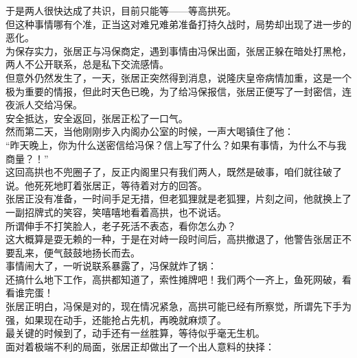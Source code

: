 \begin{multicols}{\theparacolNo}
于是两人很快达成了共识，目前只能等——等高拱死。\\

但这种事情哪有个准，正当这对难兄难弟准备打持久战时，局势却出现了进一步的恶化。\\

为保存实力，张居正与冯保商定，遇到事情由冯保出面，张居正躲在暗处打黑枪，两人不公开联系，总是私下交流感情。\\

但意外仍然发生了，一天，张居正突然得到消息，说隆庆皇帝病情加重，这是一个极为重要的情报，但此时天色已晚，为了给冯保报信，张居正便写了一封密信，连夜派人交给冯保。\\

安全抵达，安全返回，张居正松了一口气。\\

然而第二天，当他刚刚步入内阁办公室的时候，一声大喝镇住了他：\\

“昨天晚上，你为什么送密信给冯保？信上写了什么？如果有事情，为什么不与我商量？！”\\

这回高拱也不兜圈子了，反正内阁里只有我们两人，既然是破事，咱们就往破了说。他死死地盯着张居正，等待着对方的回答。\\

张居正没有准备，一时间手足无措，但老狐狸就是老狐狸，片刻之间，他就换上了一副招牌式的笑容，笑嘻嘻地看着高拱，也不说话。\\

所谓伸手不打笑脸人，老子死活不表态，看你怎么办？\\

这大概算是耍无赖的一种，于是在对峙一段时间后，高拱撤退了，他警告张居正不要乱来，便气鼓鼓地扬长而去。\\

事情闹大了，一听说联系暴露了，冯保就炸了锅：\\

还搞什么地下工作，高拱都知道了，索性摊牌吧！我们两个一齐上，鱼死网破，看看谁完蛋！\\

张居正明白，冯保是对的，现在情况紧急，高拱可能已经有所察觉，所谓先下手为强，如果现在动手，还能抢占先机，再晚就麻烦了。\\

最关键的时候到了，动手还有一丝胜算，等待似乎毫无生机。\\

面对着极端不利的局面，张居正却做出了一个出人意料的抉择：\\


\end{multicols}

